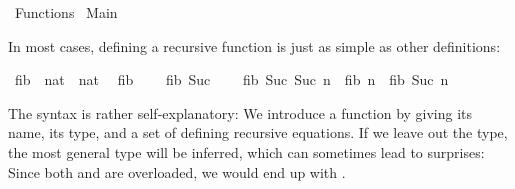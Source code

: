 %
\begin{isabellebody}%
\def\isabellecontext{Functions}%
%
\isadelimtheory
\isanewline
\isanewline
%
\endisadelimtheory
%
\isatagtheory
{}\isamarkupfalse%
\ Functions\isanewline
{}\ Main\isanewline
{}%
\endisatagtheory
{\isafoldtheory}%
%
\isadelimtheory
%
\endisadelimtheory
%
\isamarkuptrue%
%
\begin{isamarkuptext}%
In most cases, defining a recursive function is just as simple as other definitions:%
\end{isamarkuptext}%
\isamarkuptrue%
\isamarkupfalse%
\ fib\ {}{}\ {}nat\ {}\ nat{}\isanewline
{}\isanewline
\ \ {}fib\ {}\ {}\ {}{}\isanewline
{}\ {}fib\ {}Suc\ {}{}\ {}\ {}{}\isanewline
{}\ {}fib\ {}Suc\ {}Suc\ n{}{}\ {}\ fib\ n\ {}\ fib\ {}Suc\ n{}{}%
\begin{isamarkuptext}%
The syntax is rather self-explanatory: We introduce a function by
  giving its name, its type, 
  and a set of defining recursive equations.
  If we leave out the type, the most general type will be
  inferred, which can sometimes lead to surprises: Since both  and  are overloaded, we would end up
  with .%

\end{isamarkuptext}
\end{isabellebody}
